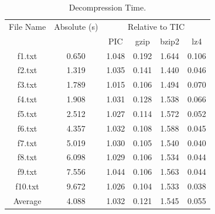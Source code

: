 \begin{table}[ht]
\centering
\begin{tabular}{cccccc}
\hline
File Name & Absolute (s) & \multicolumn{4}{c}{Relative to TIC} \\
 &  & PIC & gzip & bzip2 & lz4 \\
\hline
f1.txt & 0.650 & 1.048 & 0.192 & 1.644 & 0.106 \\
f2.txt & 1.319 & 1.035 & 0.141 & 1.440 & 0.046 \\
f3.txt & 1.789 & 1.015 & 0.106 & 1.494 & 0.070 \\
f4.txt & 1.908 & 1.031 & 0.128 & 1.538 & 0.066 \\
f5.txt & 2.512 & 1.027 & 0.114 & 1.572 & 0.052 \\
f6.txt & 4.357 & 1.032 & 0.108 & 1.588 & 0.045 \\
f7.txt & 5.019 & 1.030 & 0.105 & 1.540 & 0.040 \\
f8.txt & 6.098 & 1.029 & 0.106 & 1.534 & 0.044 \\
f9.txt & 7.556 & 1.044 & 0.106 & 1.563 & 0.044 \\
f10.txt & 9.672 & 1.026 & 0.104 & 1.533 & 0.038 \\
Average & 4.088 & 1.032 & 0.121 & 1.545 & 0.055 \\
\hline
\end{tabular}
\caption{Decompression Time.}
\label{tab:decompression\_time}
\end{table}
